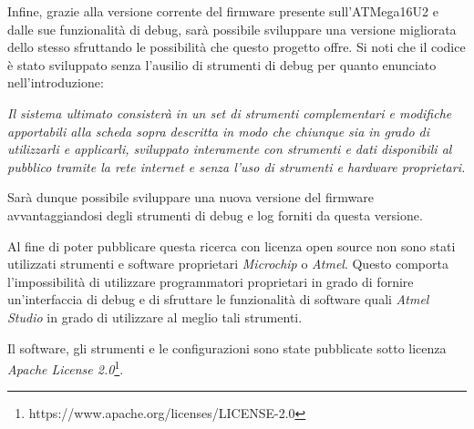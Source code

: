 Infine, grazie alla versione corrente del firmware presente sull'ATMega16U2 e dalle sue funzionalità di debug, sarà possibile sviluppare una versione migliorata dello stesso sfruttando le possibilità che questo progetto offre. Si noti che il codice è stato sviluppato senza l'ausilio di strumenti di debug per quanto enunciato nell'introduzione:
\begin{center}
    \textit{Il sistema ultimato consisterà in un set di strumenti complementari e modifiche apportabili alla scheda sopra descritta in modo che chiunque sia in grado di utilizzarli e applicarli, sviluppato interamente con strumenti e dati disponibili al pubblico tramite la rete internet e senza l'uso di strumenti e hardware proprietari.}
\end{center}

Sarà dunque possibile sviluppare una nuova versione del firmware avvantaggiandosi degli strumenti di debug e log forniti da questa versione.

Al fine di poter pubblicare questa ricerca con licenza open source non sono stati utilizzati strumenti e software proprietari \textit{Microchip} o \textit{Atmel}. Questo comporta l'impossibilità di utilizzare programmatori proprietari in grado di fornire un'interfaccia di debug e di sfruttare le funzionalità di software quali \textit{Atmel Studio} in grado di utilizzare al meglio tali strumenti.

Il software, gli strumenti e le configurazioni sono state pubblicate sotto licenza \textit{Apache License 2.0}\footnote{https://www.apache.org/licenses/LICENSE-2.0}.